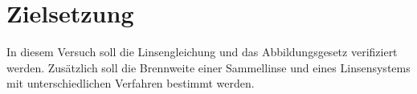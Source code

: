 \section{Zielsetzung}

\label{sec:Zielsetzung}
In diesem Versuch soll die Linsengleichung und das Abbildungsgesetz verifiziert werden. Zusätzlich
soll die Brennweite einer Sammellinse und eines Linsensystems mit unterschiedlichen Verfahren bestimmt werden. 
